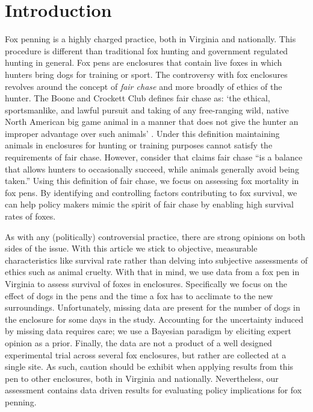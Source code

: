 \documentclass[aoas,preprint]{imsart}
\numberwithin{equation}{section}
\theoremstyle{plain}
\begin{document}
\section{Introduction}
Fox penning is a highly charged practice, both in Virginia and nationally. This procedure is different than traditional fox hunting and government regulated hunting in general. Fox pens are enclosures that contain live foxes in which hunters bring dogs for training or sport. The controversy with fox enclosures revolves around the concept of \emph{fair chase} \citep{posewitz} and more broadly of ethics of the hunter. The Boone and Crockett Club defines fair chase as: `the ethical, sportsmanlike, and lawful pursuit and taking of any free-ranging wild, native North American big game animal in a manner that does not give the hunter an improper advantage over such animals' \citep{boone}. Under this definition maintaining animals in enclosures for hunting or training purposes cannot satisfy the requirements of fair chase.  However, consider that \cite{posewitz} claims fair chase ``is a balance that allows hunters to occasionally succeed, while animals generally avoid being taken.'' Using this definition of fair chase, we focus on assessing fox mortality in fox pens. By identifying and controlling factors contributing to fox survival, we can help policy makers mimic the spirit of fair chase by enabling high survival rates of foxes.

As with any (politically) controversial practice, there are strong opinions on both sides of the issue. With this article we stick to objective, measurable characteristics like survival rate rather than delving into subjective assessments of ethics such as animal cruelty. With that in mind, we use data from a fox pen in Virginia to assess survival of foxes in enclosures. Specifically we focus on the effect of dogs in the pens and the time a fox has to acclimate to the new surroundings. Unfortunately, missing data are present for the number of dogs in the enclosure for some days in the study. Accounting for the uncertainty induced by missing data requires care; we use a Bayesian paradigm by eliciting expert opinion as a prior. Finally, the data are not a product of a well designed experimental trial across several fox enclosures, but rather are collected at a single site. As such, caution should be exhibit when applying results from this pen to other enclosures, both in Virginia and nationally. Nevertheless, our assessment contains data driven results for evaluating policy implications for fox penning.
\end{document}
